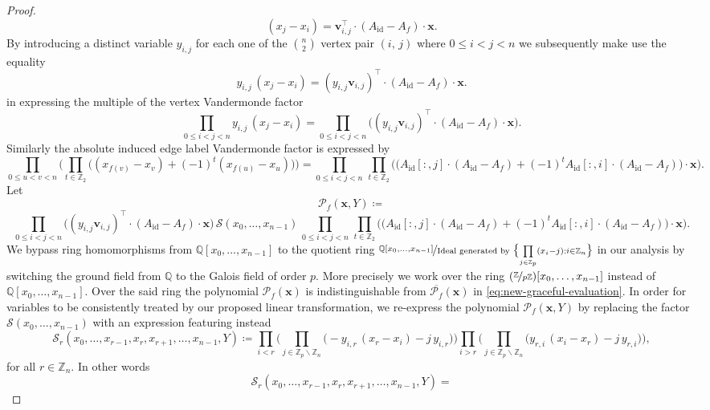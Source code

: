 \begin{proof}
\[
(x_{j}-x_{i})=\mathbf{v}_{i,j}^{\top}\cdot (A_{\text{id}}-A_{f})\cdot\mathbf{x}.
\]
By introducing a distinct variable $y_{i,j}$ for each one of the ${n \choose 2}$ vertex pair $(i,\,j)$ where $0\le i < j <n$ we subsequently make use the equality
\[
y_{i,j}\,(x_{j}-x_{i})=(y_{i,j}\mathbf{v}_{i,j})^{\top}\cdot(A_{\text{id}}-A_{f})\cdot\mathbf{x}.
\]
in expressing the multiple of the vertex Vandermonde factor
\[
\prod_{0\le i<j<n}y_{i,j}\,(x_{j}-x_{i})=\prod_{0\le i<j<n}\big((y_{i,j}\mathbf{v}_{i,j})^{\top}\cdot(A_{\text{id}}-A_{f})\cdot\mathbf{x}\big).
\]
Similarly the absolute induced edge label Vandermonde factor is expressed by
\[
\prod_{0\le u<v<n}\bigg(\prod_{t\in\mathbb{Z}_{2}}\big((x_{f(v)}-x_{v})+(-1)^{t}(x_{f(u)}-x_{u})\big)\bigg)=\prod_{0\le i<j<n}\,\prod_{t\in\mathbb{Z}_{2}}\bigg(\big(A_{\text{id}}[:,j]\cdot(A_{\text{id}}-A_{f})+(-1)^{t}A_{\text{id}}[:,i]\cdot(A_{\text{id}}-A_{f})\big)\cdot\mathbf{x}\bigg).
\]
Let
\[
\mathcal{P}_{f}(\mathbf{x},Y)\coloneq
\]
\[
\prod_{0\le i<j<n}\big((y_{i,j}\mathbf{v}_{i,j})^{\top}\cdot(A_{\text{id}}-A_{f})\cdot\mathbf{x}\big)\,\mathcal{S}(x_{0},\ldots,x_{n-1})\,\prod_{0\le i<j<n}\,\prod_{t\in\mathbb{Z}_{2}}\bigg(\big(A_{\text{id}}[:,j]\cdot(A_{\text{id}}-A_{f})+(-1)^{t}A_{\text{id}}[:,i]\cdot(A_{\text{id}}-A_{f})\big)\cdot\mathbf{x}\bigg).
\]
We bypass ring homomorphisms from $\mathbb{Q}[x_0,\ldots , x_{n-1}]$ to the quotient ring $\nicefrac{\mathbb{Q}[x_{0},\ldots,x_{n-1}]}{\text{Ideal generated by }\big\{\underset{j\in\mathbb{Z}_{p}}{\prod}(x_{i}-j):i\in\mathbb{Z}_{n}\big\}}$ in our analysis by switching the ground field from $\mathbb{Q}$ to the Galois field of order $p$. More precisely we work over the ring $(\nicefrac{\mathbb{Z}}{p\mathbb{Z}})[x_{0},\ldots,x_{n-1}]$ instead of $\mathbb{Q}[x_{0},\ldots,x_{n-1}]$. Over the said ring the polynomial $\mathcal{P}_f(\mathbf{x})$ is indistinguishable from $\overline{\mathcal{P}_{f}}(\mathbf{x})$ in \ref{eq:new-graceful-evaluation}. In order for variables to be consistently treated by our proposed linear transformation, we re-express the polynomial $\mathcal{P}_{f}(\mathbf{x},Y)$ by replacing the factor $\mathcal{S}(x_{0},\ldots,x_{n-1})$
with an expression featuring instead
\[
\mathcal{S}_{r}(x_{0},\ldots,x_{r-1},x_{r},x_{r+1},\ldots,x_{n-1},Y)\coloneq\prod_{i<r}\bigg(\prod_{j\in\mathbb{Z}_{p}\backslash\mathbb{Z}_{n}}\big(-y_{i,r}\,(x_{r}-x_{i})-j\,y_{i,r}\big)\bigg)\prod_{i>r}\bigg(\prod_{j\in\mathbb{Z}_{p}\backslash\mathbb{Z}_{n}}\big(y_{r,i}\,(x_{i}-x_{r})-j\,y_{r,i}\big)\bigg),
\]
for all $r\in \mathbb{Z}_n$. In other words
\[
\mathcal{S}_{r}(x_{0},\ldots,x_{r-1},x_{r},x_{r+1},\ldots,x_{n-1},Y)=
\]
\end{proof}
